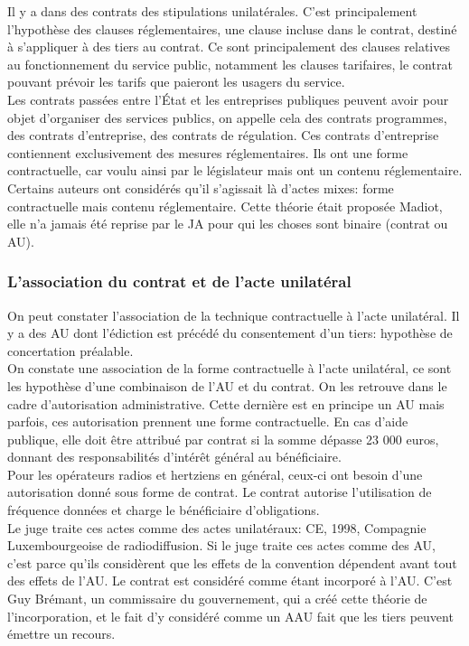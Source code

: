 \documentclass[10pt, a4paper, openany]{book}
\begin{document}
Il y a dans des contrats des stipulations unilatérales. C'est principalement l'hypothèse des clauses réglementaires, une clause incluse dans le contrat, destiné à s'appliquer à des tiers au contrat. Ce sont principalement des clauses relatives au fonctionnement du service public, notamment les clauses tarifaires, le contrat pouvant prévoir les tarifs que paieront les usagers du service. \\
Les contrats passées entre l'État et les entreprises publiques peuvent avoir pour objet d'organiser des services publics, on appelle cela des contrats programmes, des contrats d'entreprise, des contrats de régulation. Ces contrats d'entreprise contiennent exclusivement des mesures réglementaires. Ils ont une forme contractuelle, car voulu ainsi par le législateur mais ont un contenu réglementaire. \\
Certains auteurs ont considérés qu'il s'agissait là d'actes mixes: forme contractuelle mais contenu réglementaire. Cette théorie était proposée Madiot, elle n'a jamais été reprise par le JA pour qui les choses sont binaire (contrat ou AU). 

\subsubsection{L'association du contrat et de l'acte unilatéral}

On peut constater l'association de la technique contractuelle à l'acte unilatéral. Il y a des AU dont l'édiction est précédé du consentement d'un tiers: hypothèse de concertation préalable. \\
On constate une association de la forme contractuelle à l'acte unilatéral, ce sont les hypothèse d'une combinaison de l'AU et du contrat. On les retrouve dans le cadre d'autorisation administrative. Cette dernière est en principe un AU mais parfois, ces autorisation prennent une forme contractuelle. En cas d'aide publique, elle doit être attribué par contrat si la somme dépasse 23 000 euros, donnant des responsabilités d'intérêt général au bénéficiaire. \\
Pour les opérateurs radios et hertziens en général, ceux-ci ont besoin d'une autorisation donné sous forme de contrat. Le contrat autorise l'utilisation de fréquence données  et charge le bénéficiaire d'obligations. \\
Le juge traite ces actes comme des actes unilatéraux: CE, 1998, Compagnie Luxembourgeoise de radiodiffusion. Si le juge traite ces actes comme des AU, c'est parce qu'ils considèrent que les effets de la convention dépendent avant tout des effets de l'AU. Le contrat est considéré comme étant incorporé à l'AU. C'est Guy Brémant, un commissaire du gouvernement, qui a créé cette théorie de l'incorporation, et le fait d'y considéré comme un AAU fait que les tiers peuvent émettre un recours. 
\end{document}
